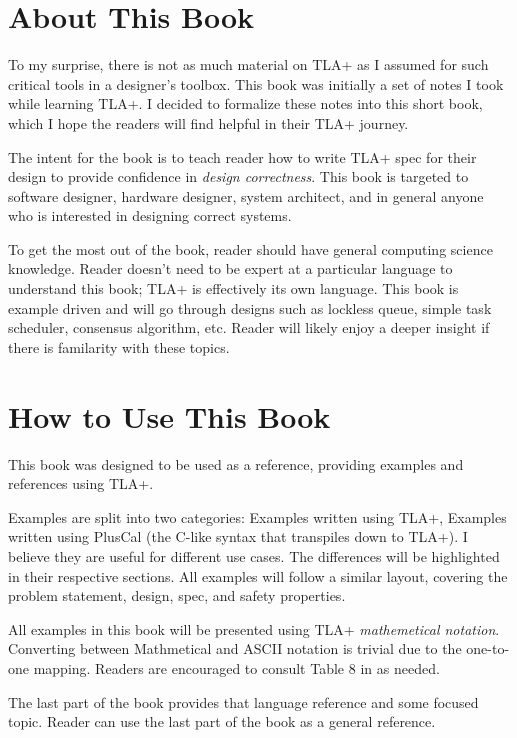 \section{About This Book}

To my surprise, there is not as much material on TLA+ as I assumed for such
critical tools in a designer's toolbox. This book was initially a set of notes I
took while learning TLA+. I decided to formalize these notes into this short
book, which I hope the readers will find helpful in their TLA+ journey.\newline

The intent for the book is to teach reader how to write TLA+ spec for their
design to provide confidence in \textit{design correctness}. This book is
targeted to software designer, hardware designer, system architect, and in
general anyone who is interested in designing correct systems.\newline 

To get the most out of the book, reader should have general computing science
knowledge. Reader doesn't need to be expert at a particular language to
understand this book; TLA+ is effectively its own language. This book is example
driven and will go through designs such as lockless queue, simple task
scheduler, consensus algorithm, etc. Reader will likely enjoy a deeper insight
if there is familarity with these topics.

\section{How to Use This Book}

This book was designed to be used as a reference, providing examples and
references using TLA+.\newline

Examples are split into two categories: Examples written using TLA+, Examples
written using PlusCal (the C-like syntax that transpiles down to TLA+). I
believe they are useful for different use cases. The differences will be
highlighted in their respective sections. All examples will follow a similar
layout, covering the problem statement, design, spec, and safety properties.\newline

All examples in this book will be presented using TLA+ \textit{mathemetical
notation}. Converting between Mathmetical and ASCII notation is trivial due to
the one-to-one mapping. Readers are encouraged to consult Table 8 in \cite{ss}
as needed.\newline

The last part of the book provides that language reference and some focused
topic. Reader can use the last part of the book as a general reference. 

